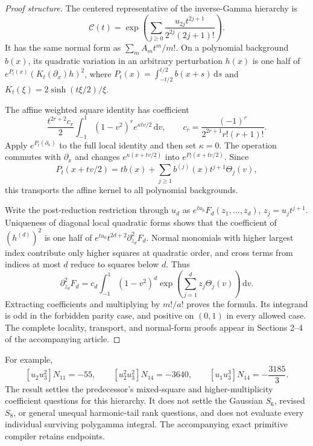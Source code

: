 \begin{proof}[Proof structure]
The centered representative of the inverse-Gamma hierarchy is
\[
 \mathcal C(t)=\exp\left(\sum_{j\ge0}
       \frac{u_{2j}t^{2j+1}}{2^{2j}(2j+1)!}\right).
\]
It has the same normal form as $\sum_m A_mt^m/m!$.
On a polynomial background $b(x)$, its quadratic variation in an
arbitrary perturbation $h(x)$ is one half of
$e^{P_t(x)}(K_t(\partial_x)h)^2$, where
$P_t(x)=\int_{-t/2}^{t/2}b(x+s)\,\mathrm ds$ and
$K_t(\xi)=2\sinh(t\xi/2)/\xi$.

The affine weighted square identity has coefficient
\[
 \frac{t^{2r+2}c_r}{2}\int_{-1}^1(1-v^2)^re^{\kappa tv/2}\,\mathrm dv,
 \qquad c_r=\frac{(-1)^r}{2^{2r+1}r!(r+1)!}.
\]
Apply $e^{P_t(\partial_\kappa)}$ to the full local identity and then
set $\kappa=0$. The operation commutes with $\partial_x$ and changes
$e^{\kappa(x+tv/2)}$ into $e^{P_t(x+tv/2)}$.
Since
\[
 P_t(x+tv/2)=tb(x)+\sum_{j\ge1}b^{(j)}(x)t^{j+1}\Theta_j(v),
\]
this transports the affine kernel to all polynomial backgrounds.

Write the post-reduction restriction through $u_d$ as
$e^{tu_0}F_d(z_1,\ldots,z_d)$, $z_j=u_jt^{j+1}$.
Uniqueness of diagonal local quadratic forms shows that the coefficient
of $(h^{(d)})^2$ is one half of
$e^{tu_0}t^{2d+2}\partial_{z_d}^2F_d$.
Normal monomials with higher largest index contribute only higher
squares at quadratic order, and cross terms from indices at most $d$
reduce to squares below $d$. Thus
\[
 \partial_{z_d}^2F_d=c_d\int_{-1}^1(1-v^2)^d
            \exp\left(\sum_{j=1}^d z_j\Theta_j(v)\right)\,\mathrm dv.
\]
Extracting coefficients and multiplying by $m!/a!$ proves the formula.
Its integrand is odd in the forbidden parity case, and positive on
$(0,1)$ in every allowed case. The complete locality, transport, and
normal-form proofs appear in Sections 2--4 of the accompanying article.
\end{proof}

For example,
\[
 [u_2u_3^2]N_{11}=-55,\qquad
 [u_2^2u_3^2]N_{14}=-3640,\qquad
 [u_1u_3^3]N_{14}=-\frac{3185}{3}.
\]
The result settles the predecessor's mixed-square and higher-multiplicity
coefficient questions for this hierarchy. It does not settle the
Gaussian $S_6$, revised $S_8$, or general unequal harmonic-tail rank
questions, and does not evaluate every individual surviving polygamma
integral. The accompanying exact primitive compiler retains endpoints.
